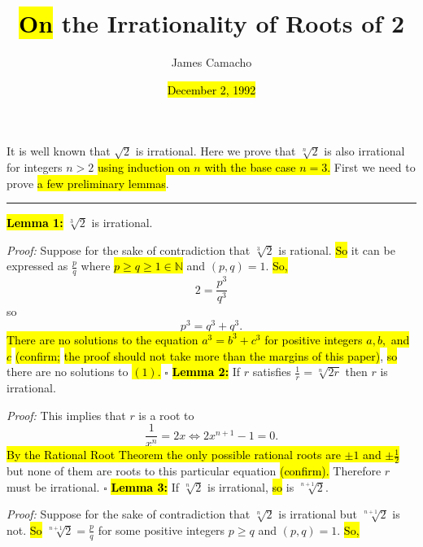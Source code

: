 \documentclass{article}
\author{James Camacho}
\title{\hl{On} the Irrationality of Roots of 2}
\date{\hl{December 2, 1992}}
\begin{document}
	\maketitle
	\par
	It is well known that $\sqrt2$ is irrational. Here we prove that $\sqrt[n]{2}$ is also irrational for integers $n > 2$ \hl{using induction on $n$ with the base case $n=3$.} First we need to prove \hl{a few preliminary lemmas}.
	\newline
	\hrule
	\vspace{5mm}
	\noindent
	\hl{
	\textbf{Lemma 1:}} $\sqrt[3]{2}$ is irrational.
	\par
	\emph{Proof:} Suppose for the sake of contradiction that $\sqrt[3]{2}$ is rational. \hl{So} it can be expressed as $\frac{p}{q}$ where \hl{$p\ge q\ge 1 \in\mathbb{N}$} and $(p, q) = 1.$ \hl{So,}
	$$2 = \frac{p^3}{q^3}$$
	so
	\begin{equation}
	p^3 = q^3 + q^3.
	\end{equation}
	\hl{There are no solutions to the equation $a^3 = b^3 + c^3$ for positive integers $a, b,$ and $c$ }\hl{(confirm; }\hl{the proof should not take more than the margins of this paper)}, \hl{so }there are no solutions to \hl{$(1)$.} $\square$
	\vspace{5mm}
	\newline
	\hl{
	\textbf{Lemma 2:}} If $r$ satisfies $\frac{1}{r} = \sqrt[n]{2r}$ then $r$ is irrational.
	\par
	\emph{Proof:} This implies that $r$ is a root to
	$$\frac{1}{x^n} = 2x\Longleftrightarrow 2x^{n+1} - 1 = 0.$$
	\hl{By the Rational Root Theorem the only possible rational roots are $\pm 1$  and $\pm \frac{1}{2}$} but none of them are roots to this particular equation \hl{(confirm).} Therefore $r$ must be irrational. $\square$
	\vspace{5mm}
	\newline
	\hl{
	\textbf{Lemma 3:}} If $\sqrt[n]{2}$ is irrational, \hl{so} is $\sqrt[n+1]{2}$.
	\par
	\emph{Proof:} Suppose for the sake of contradiction that $\sqrt[n]{2}$ is irrational but $\sqrt[n+1]{2}$ is not. \hl{So} $\sqrt[n+1]{2} = \frac{p}{q}$ for some positive integers $p\ge q$ and $(p, q) = 1$. \hl{So,}
\end{document}
